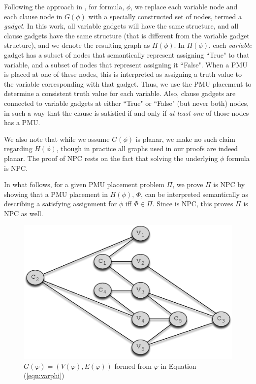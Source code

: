 Following the approach in \cite{Brueni05}, for \sat formula, $\phi$, we replace each variable node and each clause node in $G(\phi)$ with a specially constructed set of nodes,
termed a {\em gadget}. In this work, all variable gadgets will have the same structure, and all clause gadgets have the same structure (that is different from the variable gadget structure), and we denote the resulting graph as $H(\phi)$.
In $H(\phi)$, each {\em variable} gadget has a subset of nodes that semantically represent assigning ``True" to that variable, and a subset of nodes that represent assigning it ``False". When a PMU is placed at one of these nodes, this is interpreted as assigning 
a truth value to the \sat variable corresponding with that gadget. 
Thus, we use the PMU placement to determine a consistent truth value for each \sat variable. 
Also, clause gadgets are connected to variable gadgets at either ``True" or ``False" (but never both) nodes, in such a way that the clause is satisfied if and only if {\em at least one} of those nodes has a PMU.

We also note that while we assume $G(\phi)$ is planar, we make no such claim regarding $H(\phi)$, though in practice all graphs used in our proofs are indeed planar. The proof of NPC rests on the fact that solving the underlying $\phi$ formula is NPC.

In what follows, for a given PMU placement problem $\Pi$, we prove $\Pi$ is NPC by showing that a PMU placement in $H(\phi)$, $\Phi$, can be interpreted semantically as describing a satisfying assignment for $\phi$ iff $\Phi\in\Pi$. 
Since \sat is NPC, this proves $\Pi$ is  NPC as well.


\begin{figure}[t]
\centering
\includegraphics[scale=0.53]{figs/gvarphi.pdf}
\caption{$G(\varphi)=(V(\varphi),E(\varphi))$ formed from $\varphi$ in Equation (\ref{eqn:varphi}) }
\label{fig:gvarphi}
\end{figure}


